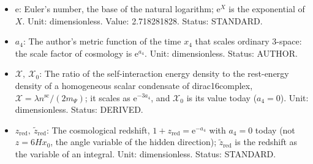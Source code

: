 \documentclass[
  10pt,
]{article}
\providecommand{\tightlist}{%
  \setlength{\itemsep}{0pt}\setlength{\parskip}{0pt}}
\begin{document}
\begin{itemize}
\tightlist
\item
  \(\mathrm{e}\): Euler's number, the base of the natural logarithm;
  \(\mathrm{e}^{X}\) is the exponential of \(X\). Unit: dimensionless.
  Value: 2.718281828. Status: STANDARD.
\item
  \(a_4\): The author's metric function of the time \(x_4\) that scales
  ordinary 3-space: the scale factor of cosmology is
  \(\mathrm{e}^{a_4}\). Unit: dimensionless. Status: AUTHOR.
\item
  \(\mathcal{X},\ \mathcal{X}_0\): The ratio of the self-interaction
  energy density to the rest-energy density of a homogeneous scalar
  condensate of dirac16complex,
  \(\mathcal{X} = \lambda n^{\mathrm{sc}}/(2m_\Psi)\); it scales as
  \(\mathrm{e}^{-3a_4}\), and \(\mathcal{X}_0\) is its value today
  (\(a_4 = 0\)). Unit: dimensionless. Status: DERIVED.
\item
  \(z_{\mathrm{red}},\ \tilde z_{\mathrm{red}}\): The cosmological
  redshift, \(1 + z_{\mathrm{red}} = \mathrm{e}^{-a_4}\) with
  \(a_4 = 0\) today (not \(z = 6Hx_0\), the angle variable of the hidden
  direction); \(\tilde z_{\mathrm{red}}\) is the redshift as the
  variable of an integral. Unit: dimensionless. Status: STANDARD.
\end{itemize}
\end{document}
